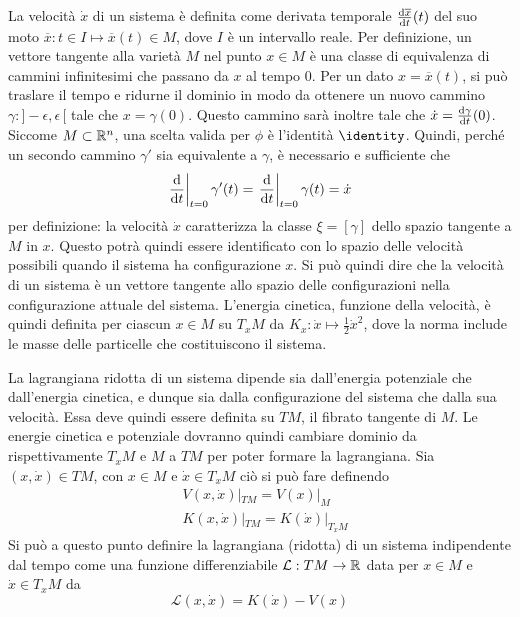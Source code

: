 La velocità $\dot{x}$ di un sistema è definita come derivata temporale $\dv{\overline{x}}{t}()(t)$ del suo moto $\overline{x}: t \in I \mapsto \overline{x}(t) \in M$, dove $I$ è un intervallo reale. Per definizione, un vettore tangente alla varietà $M$ nel punto $x \in M$ è una classe di equivalenza di cammini infinitesimi che passano da $x$ al tempo $0$. Per un dato $x =\overline{x}(t)$, si può traslare il tempo e ridurne il dominio in modo da ottenere un nuovo cammino $\gamma:]-\epsilon, \epsilon\,[$ tale che $x = \gamma(0)$. Questo cammino sarà inoltre tale che $\dot{x} = \dv{\gamma}{t}()(0)$. Siccome $M \subset \mathbb{R}^{n}$, una scelta valida per $\phi$ è l'identità $\identity$. Quindi, perché un secondo cammino $\gamma'$ sia equivalente a $\gamma$, è necessario e sufficiente che \begin{equation*}
\eval{\dv{t}}_{t=0} \gamma'(t) = \eval{\dv{t}}_{t=0} \gamma(t) = \dot{x}
\end{equation*}
per definizione: la velocità $\dot{x}$ caratterizza la classe $\xi = [\gamma]$ dello spazio tangente a $M$ in $x$. Questo potrà quindi essere identificato con lo spazio delle velocità possibili quando il sistema ha configurazione $x$. Si può quindi dire che la velocità di un sistema è un vettore tangente allo spazio delle configurazioni nella configurazione attuale del sistema. L'energia cinetica, funzione della velocità, è quindi definita per ciascun $x \in M$ su $T_x M$ da $K_x: \dot{x} \mapsto \frac{1}{2} \dot{x}^2$, dove la norma include le masse delle particelle che costituiscono il sistema.

La lagrangiana ridotta di un sistema dipende sia dall'energia potenziale che dall'energia cinetica, e dunque sia dalla configurazione del sistema che dalla sua velocità. Essa deve quindi essere definita su $TM$, il fibrato tangente di $M$. Le energie cinetica e potenziale dovranno quindi cambiare dominio da rispettivamente $T_x M$ e $M$ a $TM$ per poter formare la lagrangiana. Sia $(x,\dot{x}) \in TM$, con $x \in M$ e $\dot{x} \in T_x M$ ciò si può fare definendo \begin{equation*}
\begin{aligned}
  &V(x,\dot{x})|_{TM} = V(x)|_M \\
  &K(x, \dot{x})|_{TM} = K(\dot{x})|_{T_x M}
\end{aligned}
\end{equation*} 
Si può a questo punto definire la lagrangiana (ridotta) di un sistema indipendente dal tempo come una funzione differenziabile $\mathcal{L}:TM\to \mathbb{R}$ data per $x \in M$ e $\dot{x} \in T_x M$ da \begin{equation*}
\mathcal{L}(x,\dot{x}) = K(\dot{x}) - V(x)
\end{equation*}

